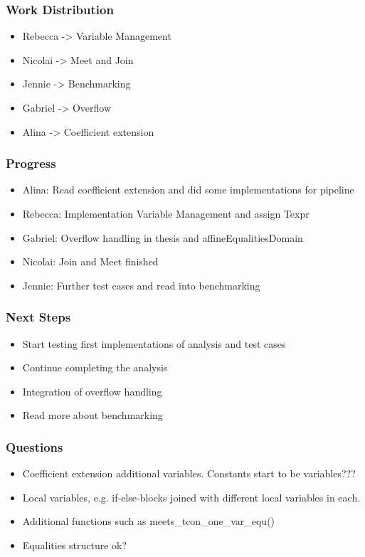 \documentclass[english,xcolor=table]{i20lecture}
\subtitle{Relational Domains}
\begin{document}

\frame{\titlepage}



\begin{frame}
	\frametitle{Work Distribution}
	\begin{itemize}
		\item Rebecca -> Variable Management
		\item Nicolai -> Meet and Join
		\item Jennie -> Benchmarking
		\item Gabriel -> Overflow
		\item Alina -> Coefficient extension
	\end{itemize}
\end{frame}

\begin{frame}
	\frametitle{Progress}
		\begin{itemize}
			\item Alina: Read coefficient extension and did some implementations for pipeline
			\item Rebecca: Implementation Variable Management and assign Texpr
			\item Gabriel: Overflow handling in thesis and affineEqualitiesDomain
			\item Nicolai: Join and Meet finished 
			\item Jennie: Further test cases and read into benchmarking
		\end{itemize}
\end{frame}

\begin{frame}
	\frametitle{Next Steps}
	\begin{itemize}
		\item Start testing first implementations of analysis and test cases
		\item Continue completing the analysis
		\item Integration of overflow handling
		\item Read more about benchmarking
	\end{itemize}
\end{frame}

\begin{frame}
	\frametitle{Questions}
	\begin{itemize}
		\item Coefficient extension additional variables. Constants start to be variables???
		\item Local variables, e.g. if-else-blocks joined with different local variables in each.
		\item Additional functions such as meets\_tcon\_one\_var\_equ()
		\item Equalities structure ok?
	\end{itemize}
\end{frame}

	
\end{document}
